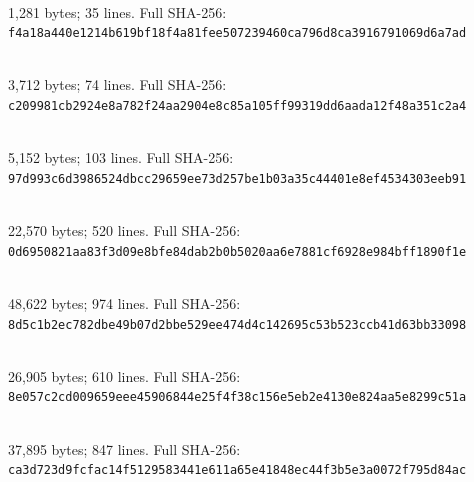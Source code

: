 \documentclass[11pt]{article}
\begin{document}
\par\noindent{}\\
1,281 bytes; 35 lines. Full SHA-256:\\
\nolinkurl{f4a18a440e1214b619bf18f4a81fee507239460ca796d8ca3916791069d6a7ad}\par\smallskip
\par\noindent{}\\
3,712 bytes; 74 lines. Full SHA-256:\\
\nolinkurl{c209981cb2924e8a782f24aa2904e8c85a105ff99319dd6aada12f48a351c2a4}\par\smallskip
\par\noindent{}\\
5,152 bytes; 103 lines. Full SHA-256:\\
\nolinkurl{97d993c6d3986524dbcc29659ee73d257be1b03a35c44401e8ef4534303eeb91}\par\smallskip
\par\noindent{}\\
22,570 bytes; 520 lines. Full SHA-256:\\
\nolinkurl{0d6950821aa83f3d09e8bfe84dab2b0b5020aa6e7881cf6928e984bff1890f1e}\par\smallskip
\par\noindent{}\\
48,622 bytes; 974 lines. Full SHA-256:\\
\nolinkurl{8d5c1b2ec782dbe49b07d2bbe529ee474d4c142695c53b523ccb41d63bb33098}\par\smallskip
\par\noindent{}\\
26,905 bytes; 610 lines. Full SHA-256:\\
\nolinkurl{8e057c2cd009659eee45906844e25f4f38c156e5eb2e4130e824aa5e8299c51a}\par\smallskip
\par\noindent{}\\
37,895 bytes; 847 lines. Full SHA-256:\\
\nolinkurl{ca3d723d9fcfac14f5129583441e611a65e41848ec44f3b5e3a0072f795d84ac}\par\smallskip
\par\noindent{}\\
\end{document}
